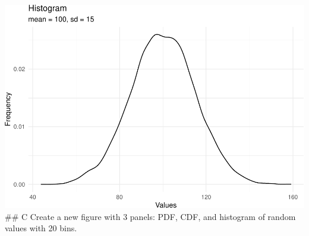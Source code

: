 \documentclass[
]{article}
\begin{document}
\includegraphics{es_files/figure-latex/unnamed-chunk-11-1.pdf} \#\# C
Create a new figure with 3 panels: PDF, CDF, and histogram of random
values with 20 bins.
\end{document}
